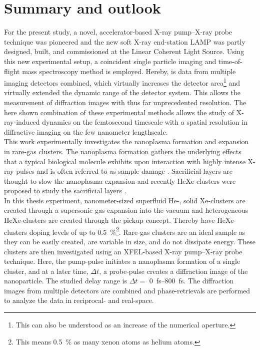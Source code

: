 \chapter{Summary and outlook}\label{ch:summary_outlook}
For the present study, a novel, accelerator-based X-ray pump--X-ray probe technique was pioneered \citep{Lutman-2013-PRL} and the new soft X-ray end-station LAMP was partly designed, built, and commissioned \citep{Ferguson-2015-JSR} at the Linear Coherent Light Source. Using this new experimental setup, a coincident single particle imaging and time-of-flight mass spectroscopy method is employed. Hereby, is data from multiple imaging detectors combined, which virtually increases the detector area\footnote{This can also be understood as an increase of the numerical aperture.} and virtually extended the dynamic range of the detector system. This allows the measurement of diffraction images with thus far unprecedented resolution. The here shown combination of these experimental methods allows the study of X-ray-induced dynamics on the femtosecond timescale with a spatial resolution in diffractive imaging on the few nanometer lengthscale.\\[1\baselineskip]
%
This work experimentally investigates the nanoplasma formation and expansion in rare-gas clusters. The nanoplasma formation gathers the underlying effects that a typical biological molecule exhibits upon interaction with highly intense X-ray pulses and is often referred to as sample damage \cite{Neutze-2000-Nature,Arbeiter-2011-NJP}. Sacrificial layers are thought to slow the nanoplasma expansion \cite{Hau-Riege-2007-PRL,Hau-Riege-2010-PRL} and recently HeXe-clusters were proposed to study the sacrificial layers \cite{Mikaberidze-2008-PRA}.\\[1\baselineskip]
%
In this thesis experiment, nanometer-sized superfluid He-, solid Xe-clusters are created through a supersonic gas expansion into the vacuum and heterogeneous HeXe-clusters are created through the pickup concept. Thereby have HeXe-clusters doping levels of up to \SI{0.5}{\percent}\footnote{This means \SI{0.5}{\percent} as many xenon atoms as helium atoms.}. Rare-gas clusters are an ideal sample as they can be easily created, are variable in size, and do not dissipate energy. These clusters are then investigated using an XFEL-based X-ray pump--X-ray probe technique. Here, the pump-pulse initiates a nanoplasma formation of a single cluster, and at a later time, $\Delta t$, a probe-pulse creates a diffraction image of the nanoparticle. The studied delay range is $\Delta t=$ \SIrange{0}{800}{\femto\second}. The diffraction images from multiple detectors are combined and phase-retrievals are performed to analyze the data in reciprocal- and real-space.\\[1\baselineskip]
